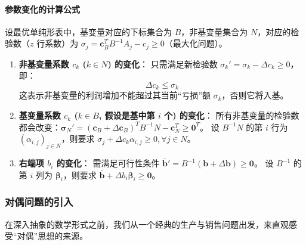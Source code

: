 \documentclass[12pt]{article}
\theoremstyle{plain}
\theoremstyle{definition}
\begin{document}
\paragraph{参数变化的计算公式}
设最优单纯形表中，基变量对应的下标集合为 $B$，非基变量集合为 $N$，对应的检验数（$z$ 行系数）为 $\sigma_j = \bm{c}_B^T B^{-1} A_j - c_j \geq 0$（最大化问题）。
\begin{enumerate}
    \item \textbf{非基变量系数 $c_k$ ($k \in N$) 的变化}：
    只需满足新检验数 $\sigma_k' = \sigma_k - \Delta c_k \geq 0$，即：
    \begin{equation}
        \Delta c_k \leq \sigma_k
    \end{equation}
    这表示非基变量的利润增加不能超过其当前“亏损”额 $\sigma_k$，否则它将入基。

    \item \textbf{基变量系数 $c_k$ ($k \in B$, 假设是基中第 $i$ 个) 的变化}：
    所有非基变量的检验数都会改变：$\bm{\sigma}_N' = (\bm{c}_B + \Delta \bm{c}_B)^T B^{-1} N - \bm{c}_N^T \geq \bm{0}^T$。
    设 $B^{-1} N$ 的第 $i$ 行为 $( \alpha_{i,j} )_{j \in N}$，则要求 $\sigma_j + \Delta c_k \alpha_{i,j} \geq 0, \forall j \in N$。

    \item \textbf{右端项 $b_i$ 的变化}：
    需满足可行性条件 $\bar{\bm{b}}' = B^{-1}(\bm{b} + \Delta \bm{b}) \geq \bm{0}$。
    设 $B^{-1}$ 的第 $i$ 列为 $\bm{\beta}_i$，则要求 $\bar{\bm{b}} + \Delta b_i \bm{\beta}_i \geq \bm{0}$。
\end{enumerate}

\subsubsection{对偶问题的引入}\label{subsubsec:duality_introduction}

在深入抽象的数学形式之前，我们从一个经典的生产与销售问题出发，来直观感受“对偶”思想的来源。
\end{document}
